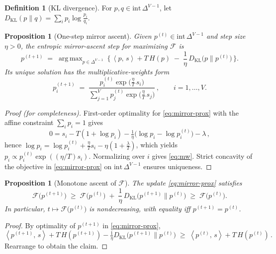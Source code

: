 \documentclass[10pt,a4paper]{amsart}
\numberwithin{equation}{section}
\theoremstyle{plain}
\newtheorem{proposition}[theorem]{Proposition}
\theoremstyle{definition}
\newtheorem{definition}[theorem]{Definition}
\theoremstyle{remark}
\DeclareMathOperator*{\argmax}{arg\,max}
\DeclareMathOperator{\KL}{KL}
\newcommand{\1}{\mathbbm{1}}
\newcommand{\ip}[2]{\left\langle #1,\, #2 \right\rangle}
\newcommand{\Hent}{H}
\newcommand{\simplex}{\Delta^{V-1}}
\begin{document}
\begin{definition}[KL divergence]
For $p,q\in\mathrm{int}\,\simplex$, let $D_{\KL}(p\|q)=\sum_i p_i\log\!\frac{p_i}{q_i}$.
\end{definition}

\begin{proposition}[One-step mirror ascent]\label{prop:mirror-step}
Given $p^{(t)}\in\mathrm{int}\,\simplex$ and step size $\eta>0$, the entropic mirror-ascent step for maximizing $\mathcal{F}$ is
\begin{equation}\label{eq:mirror-prox}
p^{(t+1)} \;=\; \argmax_{p\in\simplex}\ \Big\{\, \ip{p}{s} + T\,\Hent(p)\;-\;\frac{1}{\eta}\,D_{\KL}\!\big(p\|p^{(t)}\big)\,\Big\}.
\end{equation}
Its unique solution has the multiplicative-weights form
\begin{equation}\label{eq:mw}
p^{(t+1)}_i \;=\; \frac{p^{(t)}_i \exp\!\big(\tfrac{\eta}{T}\,s_i\big)}{\sum_{j=1}^V p^{(t)}_j \exp\!\big(\tfrac{\eta}{T}\,s_j\big)}\,,\qquad i=1,\dots,V.
\end{equation}
\end{proposition}

\begin{proof}[Proof (for completeness)]
First-order optimality for \eqref{eq:mirror-prox} with the affine constraint $\sum_i p_i=1$ gives
\[
0 = s_i - T(1+\log p_i) - \tfrac{1}{\eta}\big(\log p_i - \log p^{(t)}_i\big) - \lambda\,,
\]
hence $\log p_i = \log p^{(t)}_i + \tfrac{\eta}{T}s_i - \eta(1+\tfrac{\lambda}{T})$, which yields
$p_i \propto p^{(t)}_i \exp((\eta/T)s_i)$. Normalizing over $i$ gives \eqref{eq:mw}. Strict concavity of the objective in \eqref{eq:mirror-prox} on $\mathrm{int}\,\simplex$ ensures uniqueness.
\end{proof}

\begin{proposition}[Monotone ascent of $\mathcal{F}$]\label{prop:ascent}
The update \eqref{eq:mirror-prox} satisfies
\[
\mathcal{F}\!\big(p^{(t+1)}\big) \;\ge\; \mathcal{F}\!\big(p^{(t)}\big)\;+\;\frac{1}{\eta}\,D_{\KL}\!\big(p^{(t+1)}\|p^{(t)}\big)\;\ge\;\mathcal{F}\!\big(p^{(t)}\big).
\]
In particular, $t\mapsto \mathcal{F}\!\big(p^{(t)}\big)$ is nondecreasing, with equality iff $p^{(t+1)}=p^{(t)}$.
\end{proposition}

\begin{proof}
By optimality of $p^{(t+1)}$ in \eqref{eq:mirror-prox},
\[
\ip{p^{(t+1)}}{s} + T\,\Hent(p^{(t+1)}) - \tfrac{1}{\eta}D_{\KL}\!\big(p^{(t+1)}\|p^{(t)}\big)
\;\ge\; \ip{p^{(t)}}{s} + T\,\Hent(p^{(t)})\,.
\]
Rearrange to obtain the claim.
\end{proof}
\end{document}
